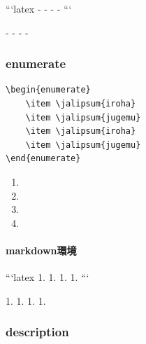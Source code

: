 \documentclass[
    article,
    head_space=25truemm,
    foot_space=10truemm,
    gutter=15truemm]{jlreq}
\begin{document}
\begin{markdown}
```latex
- 
- 
- 
- 
```
\end{markdown}

\begin{markdown}
- 
- 
- 
- 
\end{markdown}

\subsubsection{enumerate}

\begin{verbatim}
\begin{enumerate}
    \item \jalipsum{iroha}
    \item \jalipsum{jugemu}
    \item \jalipsum{iroha}
    \item \jalipsum{jugemu}
\end{enumerate}
\end{verbatim}

\begin{enumerate}
    \item {}
    \item {}
    \item {}
    \item {}
\end{enumerate}

\paragraph{markdown環境}

\begin{markdown}
```latex
1. 
1. 
1. 
1. 
```
\end{markdown}

\begin{markdown}
1. 
1. 
1. 
1. 
\end{markdown}


\subsubsection{description}
\end{document}
